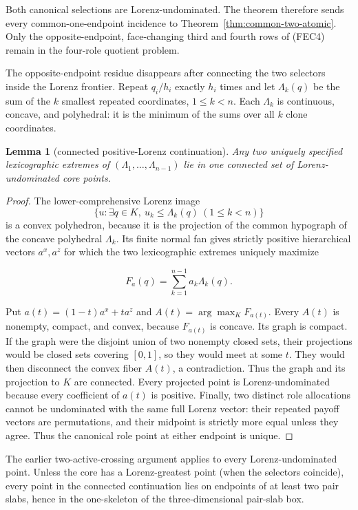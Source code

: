 \documentclass[11pt]{article}
\newtheorem{lemma}[theorem]{Lemma}
\begin{document}
Both canonical selections are Lorenz-undominated.  The theorem therefore
sends every common-one-endpoint incidence to
Theorem~\ref{thm:common-two-atomic}.  Only the opposite-endpoint,
face-changing third and fourth rows of (FEC4) remain in the four-role
quotient problem.

The opposite-endpoint residue disappears after connecting the two selectors
inside the Lorenz frontier.  Repeat $q_i/h_i$ exactly $h_i$ times and let
$\Lambda_k(q)$ be the sum of the $k$ smallest repeated coordinates,
$1\le k<n$.  Each $\Lambda_k$ is continuous, concave, and polyhedral: it is
the minimum of the sums over all $k$ clone coordinates.

\begin{lemma}[connected positive-Lorenz continuation]
Any two uniquely specified lexicographic extremes of
$(\Lambda_1,\ldots,\Lambda_{n-1})$ lie in one connected set of
Lorenz-undominated core points.
\end{lemma}

\begin{proof}
The lower-comprehensive Lorenz image
\[
 \{u:\exists q\in K,\ u_k\le\Lambda_k(q)\ (1\le k<n)\}
\]
is a convex polyhedron, because it is the projection of the common hypograph of
the concave polyhedral $\Lambda_k$.  Its finite normal fan gives strictly
positive hierarchical vectors $a^x,a^z$ for which the two lexicographic
extremes uniquely maximize

\[
 F_a(q)=\sum_{k=1}^{n-1}a_k\Lambda_k(q).                \tag{FEC9}
\]

Put $a(t)=(1-t)a^x+ta^z$ and
$A(t)=\arg\max_KF_{a(t)}$.  Every $A(t)$ is nonempty, compact, and convex,
because $F_{a(t)}$ is concave.  Its graph is compact.  If the graph were the
disjoint union of two nonempty closed sets, their projections would be closed
sets covering $[0,1]$, so they would meet at some $t$.  They would then
disconnect the convex fiber $A(t)$, a contradiction.  Thus the graph and its
projection to $K$ are connected.  Every projected point is
Lorenz-undominated because every coefficient of $a(t)$ is positive.
Finally, two distinct role allocations cannot be undominated with the same
full Lorenz vector: their repeated payoff vectors are permutations, and
their midpoint is strictly more equal unless they agree.  Thus the canonical
role point at either endpoint is unique.
\end{proof}

The earlier two-active-crossing argument applies to every
Lorenz-undominated point.  Unless the core has a Lorenz-greatest point (when
the selectors coincide), every point in the connected continuation lies on
endpoints of at least two pair slabs, hence in the one-skeleton of the
three-dimensional pair-slab box.
\end{document}
